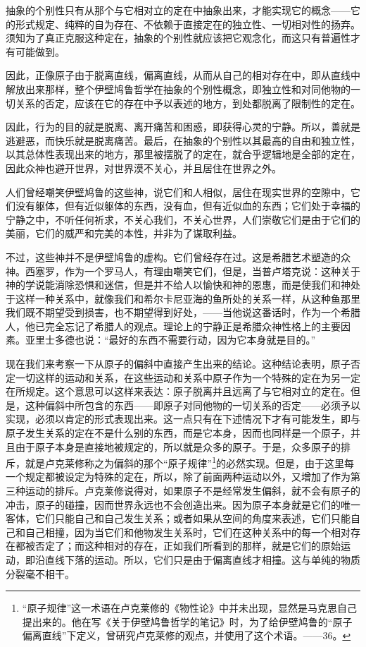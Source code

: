 \documentclass[a4paper,twoside,12pt]{ctexart}
\begin{document}
抽象的个别性只有从那个与它相对立的定在中抽象出来，才能实现它的概念——它的形式规定、纯粹的自为存在、不依赖于直接定在的独立性、一切相对性的扬弃。须知为了真正克服这种定在，抽象的个别性就应该把它观念化，而这只有普遍性才有可能做到。

因此，正像原子由于脱离直线，偏离直线，从而从自己的相对存在中，即从直线中解放出来那样，整个伊壁鸠鲁哲学在抽象的个别性概念，即独立性和对同他物的一切关系的否定，应该在它的存在中予以表述的地方，到处都脱离了限制性的定在。

因此，行为的目的就是脱离、离开痛苦和困惑，即获得心灵的宁静。所以，善就是逃避恶，而快乐就是脱离痛苦。最后，在抽象的个别性以其最高的自由和独立性，以其总体性表现出来的地方，那里被摆脱了的定在，就合乎逻辑地是全部的定在，因此众神也避开世界，对世界漠不关心，并且居住在世界之外。

人们曾经嘲笑伊壁鸠鲁的这些神，说它们和人相似，居住在现实世界的空隙中，它们没有躯体，但有近似躯体的东西，没有血，但有近似血的东西；它们处于幸福的宁静之中，不听任何祈求，不关心我们，不关心世界，人们崇敬它们是由于它们的美丽，它们的威严和完美的本性，并非为了谋取利益。

不过，这些神并不是伊壁鸠鲁的虚构。它们曾经存在过。这是希腊艺术塑造的众神。西塞罗，作为一个罗马人，有理由嘲笑它们，但是，当普卢塔克说：这种关于神的学说能消除恐惧和迷信，但是并不给人以愉快和神的恩惠，而是使我们和神处于这样一种关系中，就像我们和希尔卡尼亚海的鱼所处的关系一样，从这种鱼那里我们既不期望受到损害，也不期望得到好处，——当他说这番话时，作为一个希腊人，他已完全忘记了希腊人的观点。理论上的宁静正是希腊众神性格上的主要因素。亚里士多德也说：“最好的东西不需要行动，因为它本身就是目的。”

现在我们来考察一下从原子的偏斜中直接产生出来的结论。这种结论表明，原子否定一切这样的运动和关系，在这些运动和关系中原子作为一个特殊的定在为另一定在所规定。这个意思可以这样来表达：原子脱离并且远离了与它相对立的定在。但是，这种偏斜中所包含的东西——即原子对同他物的一切关系的否定——必须予以实现，必须以肯定的形式表现出来。这一点只有在下述情况下才有可能发生，即与原子发生关系的定在不是什么别的东西，而是它本身，因而也同样是一个原子，并且由于原子本身是直接地被规定的，所以就是众多的原子。于是，众多原子的排斥，就是卢克莱修称之为偏斜的那个“原子规律”\footnote{“原子规律”这一术语在卢克莱修的《物性论》中并未出现，显然是马克思自己提出来的。他在写《关于伊壁鸠鲁哲学的笔记》时，为了给伊壁鸠鲁的“原子偏离直线”下定义，曾研究卢克莱修的观点，并使用了这个术语。——36。}的必然实现。但是，由于这里每一个规定都被设定为特殊的定在，所以，除了前面两种运动以外，又增加了作为第三种运动的排斥。卢克莱修说得对，如果原子不是经常发生偏斜，就不会有原子的冲击，原子的碰撞，因而世界永远也不会创造出来。因为原子本身就是它们的唯一客体，它们只能自己和自己发生关系；或者如果从空间的角度来表述，它们只能自己和自己相撞，因为当它们和他物发生关系时，它们在这种关系中的每一个相对存在都被否定了；而这种相对的存在，正如我们所看到的那样，就是它们的原始运动，即沿直线下落的运动。所以，它们只是由于偏离直线才相撞。这与单纯的物质分裂毫不相干。
\end{document}
